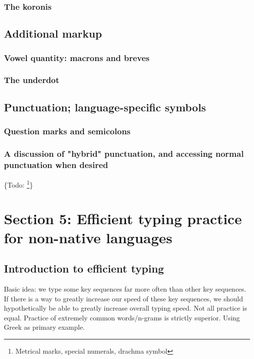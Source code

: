 \documentclass[11pt]{article}
\begin{document}
\subsubsection{The koronis}
\label{sec:org73e2dd7}

\subsection{Additional markup}
\label{sec:org3a96710}

\subsubsection{Vowel quantity: macrons and breves}
\label{sec:org5d5cb66}

\subsubsection{The underdot}
\label{sec:org407857b}

\subsection{Punctuation; language-specific symbols}
\label{sec:org3c7dc74}

\subsubsection{Question marks and semicolons}
\label{sec:org2d731d6}

\subsubsection{A discussion of "hybrid" punctuation, and accessing normal punctuation when desired}
\label{sec:org852a70f}

\{Todo: \footnote{Metrical marks, special numerals, drachma symbol}\}

\section{Section 5: Efficient typing practice for non-native languages}
\label{sec:orge8bd994}

\subsection{Introduction to efficient typing}
\label{sec:org58362c7}

Basic idea: we type some key sequences far more often than other key sequences. If there is a way to greatly increase our speed of these key sequences, we should hypothetically be able to greatly increase overall typing speed. Not all practice is equal. Practice of extremely common words/n-grams is strictly superior. Using Greek as primary example.
\end{document}
